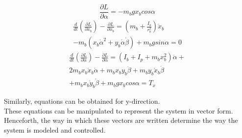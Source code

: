 \documentclass[conference]{IEEEtran}
\begin{document}
\begin{equation}
\frac{\partial L}{\partial \alpha} = -m_{b}gx_{b}cos\alpha
\label{eq10}\end{equation}
\begin{equation}
\begin{split}
\frac{d}{dt}\left(\frac{\partial L}{\partial \dot x_{b}}\right) - \frac{\partial L}{\partial x_{b}} = \left(m_{b} + \frac{I_{b}}{r_{b}^{2}}\right)\ddot x_{b} \\- m_{b}(x_{b}\dot\alpha^{2} + y_{b}\dot\alpha\dot\beta) + m_{b}gsin\alpha = 0
\end{split}
\label{eq11}\end{equation}
\begin{equation}
\begin{split}
\frac{d}{dt}\left(\frac{\partial L}{\partial \dot \alpha}\right) - \frac{\partial L}{\partial \alpha} = (I_{b} + I_{p}  + m_{b}x_{b}^{2})\ddot \alpha + \\2m_{b}x_{b}\dot x_{b} \dot \alpha + m_{b}x_{b} y_{b} \ddot \beta + m_{b}y_{b}\dot x_{b} \dot \beta \\+ m_{b}x_{b}\dot y_{b} \dot \beta + m_{b}gx_{b}cos\alpha = T_{x}
\end{split}
\label{eq12}\end{equation}

Similarly, equations can be obtained for y-direction. \\
These equations can be manipulated to represent the system in vector form. Henceforth, the way in which these vectors are written determine the way the system is modeled and controlled.
\end{document}
